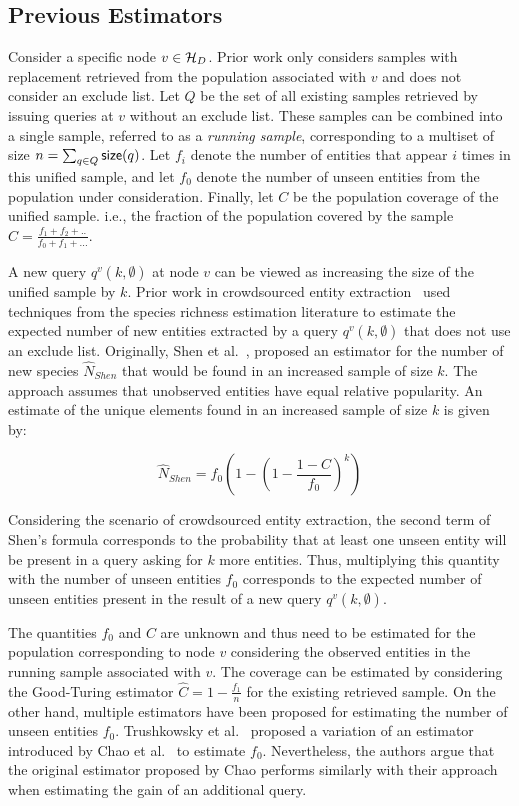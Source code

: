 \subsection{Previous Estimators}
\label{sec:prevest}
Consider a specific node $v \in \mathcal{H}_D$. Prior work only considers samples with replacement retrieved from the population associated with $v$ and does not consider an exclude list. Let $Q$ be the set of all existing samples retrieved by issuing queries at $v$ without an exclude list. These samples can be combined into a single sample, referred to as a {\em running sample}, corresponding to a multiset of size $n = \sum_{q \in Q} {\sf size}(q)$. Let $f_i$ denote the number of entities that appear $i$ times in this unified sample, and let $f_0$ denote the number of unseen entities from the population under consideration. Finally, let $C$ be the population coverage of the unified sample. i.e., the fraction of the population covered by the sample  $C = \frac{f_1 + f_2 + ..}{f_0 + f_1 + ...}$.

A new query $q^v(k,\emptyset)$ at node $v$ can be viewed as increasing the size of the unified sample by $k$. Prior work in crowdsourced entity extraction~\cite{trushkowsky:2013} used techniques from the species richness estimation literature to estimate the expected number of new entities extracted by a query $q^v(k,\emptyset)$ that does not use an exclude list. Originally, Shen et al.~\cite{shen:2003}, proposed an estimator for the number of new species $\hat{N}_{Shen}$ that would be found in an increased sample of size $k$. The approach assumes that unobserved entities have equal relative popularity. An estimate of the unique elements found in an increased sample of size $k$ is given by:

\begin{equation}
\label{eq:shen}
\hat{N}_{Shen} = f_0\left( 1 - \left(1 - \frac{1 - C}{f_0}\right)^k\right)
\end{equation}
\vspace{5pt}

Considering the scenario of crowdsourced entity extraction, the second term of Shen's formula corresponds to the probability that at least one unseen entity will be present in a query asking for $k$ more entities. Thus, multiplying this quantity with the number of unseen entities $f_0$ corresponds to the expected number of unseen entities present in the result of a new query $q^v(k,\emptyset)$.

The quantities $f_0$ and $C$ are unknown and thus need to be estimated for the population corresponding to node $v$ considering the observed entities in the running sample associated with $v$. The coverage can be estimated by considering the Good-Turing estimator $\hat{C} = 1 - \frac{f_1}{n}$ for the existing retrieved sample. On the other hand, multiple estimators have been proposed for estimating the number of unseen entities $f_0$. Trushkowsky et al.~\cite{trushkowsky:2013} proposed a variation of an estimator introduced by Chao et al.~\cite{chao:1992} to estimate $f_0$. Nevertheless, the authors argue that the original estimator proposed by Chao performs similarly with their approach when estimating the gain of an additional query. 

